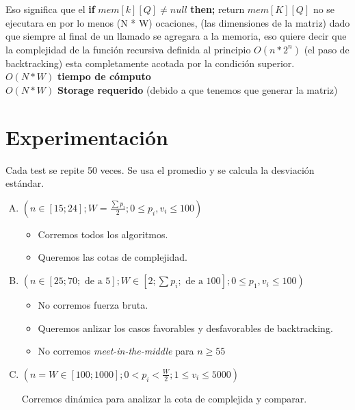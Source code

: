 \documentclass[fleqn, 11pt]{article}
\begin{document}
Eso significa que el \textbf{if} $mem[k][Q] \neq null$ \textbf{then;} return $mem[K][Q]$ no se ejecutara en por lo menos (N * W) ocaciones, (las dimensiones de la matriz) dado que siempre al final de un llamado se agregara a la memoria, eso quiere decir que la complejidad de la función recursiva definida al principio $O(n*2^n)$ (el paso de backtracking) esta completamente acotada por la condición superior. \\

\small $O(N * W)$ \textbf{tiempo de cómputo} \\
\small $O(N * W)$ \textbf{Storage requerido} (debido a que tenemos que generar la matriz) \\

\section{Experimentación}

Cada test se repite 50 veces. Se usa el promedio y se calcula la desviación
estándar.

\begin{enumerate}[A.]
\item $(n \in [15; 24];
	W=\frac{\sum p_i}{2};
	0 \leq p_i, v_i \leq 100)$

\begin{itemize}
\item Corremos todos los algoritmos.
\item Queremos las cotas de complejidad.
\end{itemize}

\item $(n \in [25; 70; \text{ de a } 5];
	W \in [2; \sum p_i; \text{ de a } 100];
	0 \leq p_1, v_i \leq 100)$

\begin{itemize}
\item No corremos fuerza bruta.
\item Queremos anlizar los casos favorables y desfavorables de backtracking.
\item No corremos \emph{meet-in-the-middle} para $n \geq 55$
\end{itemize}

\item $(n = W \in [100; 1000];
        0 < p_i < \frac{W}{2};
        1 \leq v_i \leq 5000)$

Corremos dinámica para analizar la cota de complejida y comparar.
\end{enumerate}
\end{document}

